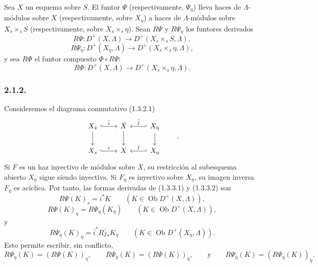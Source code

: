 \pageoriginale

Sea $X$ un esquema sobre $S$. El funtor $\Psi$ (respectivamente,
$\Psi_\eta$) lleva haces de $\Lambda$-módulos sobre $X$ (respectivamente,
sobre $X_\eta$) a haces de $\Lambda$-módulos sobre $X_s\times_sS$
(respectivamente, sobre $X_s\times_s\eta$). Sean $R\Psi$ y $R\Psi_\eta$ los
funtores derivados
\begin{equation*}
R\Psi:D^+(X,\Lambda)\longrightarrow D^+(X_s\times_sS,\Lambda),
\end{equation*}
\begin{equation*}
R\Psi_\eta:D^+(X_\eta,\Lambda)
\longrightarrow D^+(X_s\times_s\eta,\Lambda),
\end{equation*}
y sea $R\Phi$ el funtor compuesto $\Phi\circ R\Psi$:
\begin{equation*}
R\Phi:D^+(X,\Lambda)
\longrightarrow D^+(X_s\times_s\eta,\Lambda).
\end{equation*}

\subsubsection*{2.1.2.}
Consideremos el diagrama conmutativo (1.3.2.1)
\begin{equation}\notag
\begin{tikzcd}
X_{\bar s} \arrow[r, hook, "\bar i"] \arrow[d]
  & \bar X \arrow[d]
  & X_{\bar\eta} \arrow[l, hook', "\bar j"'] \arrow[d] \\
X_s \arrow[r, hook, "i"] & X & X_\eta \arrow[l, hook', "j"']
\end{tikzcd}
\qquad .
\end{equation}
Si $F$ es un haz inyectivo de módulos sobre $X$, su restricción al subesquema
abierto $X_\eta$ sigue siendo inyectiva. Si $F_\eta$ es inyectivo sobre
$X_\eta$, su imagen inversa $F_{\bar\eta}$ es acíclica. Por tanto, las formas
derivadas de (1.3.3.1) y (1.3.3.2) son
\begin{equation}\tag{2.1.2.1}
R\Psi(K)_s=i^*K
\qquad(K\in\operatorname{Ob}D^+(X,\Lambda)),
\end{equation}
\begin{equation}\tag{2.1.2.2}
R\Psi(K)_\eta=R\Psi_\eta(K_\eta)
\qquad(K\in\operatorname{Ob}D^+(X,\Lambda)),
\end{equation}
y
\begin{equation}\tag{2.1.2.3}
R\Psi_\eta(K)_{\bar\eta}
=\bar i^*R\bar j_*K_{\bar\eta}
\qquad(K\in\operatorname{Ob}D^+(X_\eta,\Lambda)).
\end{equation}
Esto permite escribir, sin conflicto,
{\footnotesize\begin{equation*}
R\Psi_\eta(K)=(R\Psi(K))_\eta,
\qquad
R\Psi_{\bar\eta}(K)=(R\Psi(K))_{\bar\eta},
\qquad\text{y}\qquad
R\Psi_{\bar\eta}(K)=(R\Psi_\eta(K))_{\bar\eta}.
\end{equation*}}
\pageoriginale

